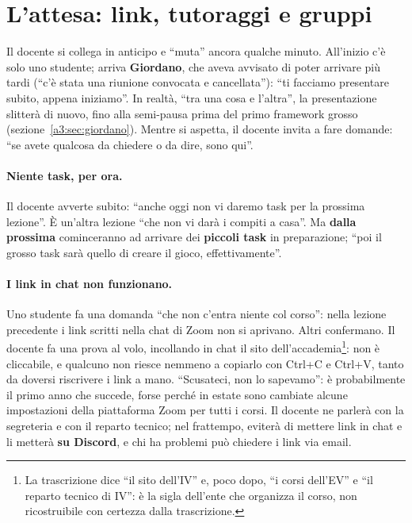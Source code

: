 \section{L'attesa: link, tutoraggi e gruppi}
\label{a3:sec:attesa}

Il docente si collega in anticipo e ``muta'' ancora qualche minuto. All'inizio
c'è solo uno studente; arriva \textbf{Giordano}, che aveva avvisato di poter
arrivare più tardi (``c'è stata una riunione convocata e cancellata''): ``ti
facciamo presentare subito, appena iniziamo''. In realtà, ``tra una cosa e
l'altra'', la presentazione slitterà di nuovo, fino alla semi-pausa prima del
primo framework grosso (sezione~\ref{a3:sec:giordano}). Mentre si aspetta, il
docente invita a fare domande: ``se avete qualcosa da chiedere o da dire, sono
qui''.

\paragraph{Niente task, per ora.} Il docente avverte subito: ``anche oggi non vi
daremo task per la prossima lezione''. È un'altra lezione ``che non vi darà i
compiti a casa''. Ma \textbf{dalla prossima} cominceranno ad arrivare dei
\textbf{piccoli task} in preparazione; ``poi il grosso task sarà quello di creare
il gioco, effettivamente''.

\paragraph{I link in chat non funzionano.} Uno studente fa una domanda ``che non
c'entra niente col corso'': nella lezione precedente i link scritti nella chat di
Zoom non si aprivano. Altri confermano. Il docente fa una prova al volo,
incollando in chat il sito dell'accademia\footnote{La trascrizione dice ``il sito
dell'IV'' e, poco dopo, ``i corsi dell'EV'' e ``il reparto tecnico di IV'': è la
sigla dell'ente che organizza il corso, non ricostruibile con certezza dalla
trascrizione.}: non è cliccabile, e qualcuno non riesce nemmeno a copiarlo con
Ctrl+C e Ctrl+V, tanto da doversi riscrivere i link a mano. ``Scusateci, non lo
sapevamo'': è probabilmente il primo anno che succede, forse perché in estate
sono cambiate alcune impostazioni della piattaforma Zoom per tutti i corsi. Il
docente ne parlerà con la segreteria e con il reparto tecnico; nel frattempo,
eviterà di mettere link in chat e li metterà \textbf{su Discord}, e chi ha
problemi può chiedere i link via email.

